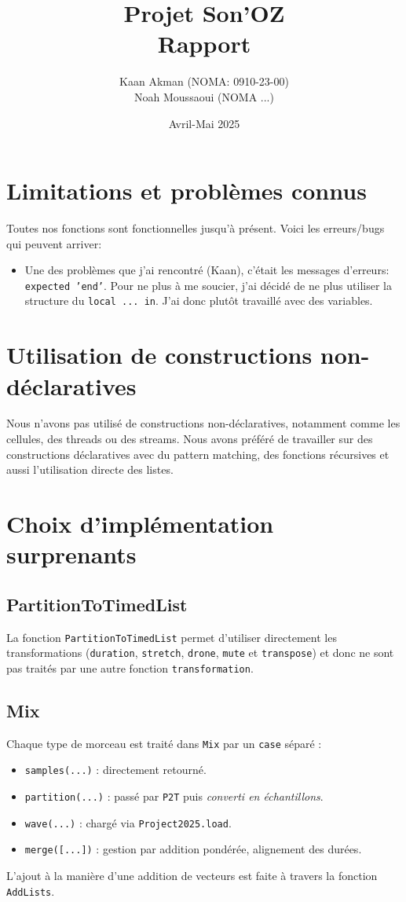 \documentclass[a4paper,11pt]{article}
\title{Projet Son'OZ\\Rapport}
\author{Kaan Akman (NOMA: 0910-23-00) \\ Noah Moussaoui (NOMA ...)}
\date{Avril-Mai 2025}
\begin{document}
\maketitle

\section{Limitations et problèmes connus}

Toutes nos fonctions sont fonctionnelles jusqu'à présent. Voici les erreurs/bugs qui peuvent arriver:
\begin{itemize}
    \item Une des problèmes que j'ai rencontré (Kaan), c'était les messages d'erreurs: \texttt{expected 'end'}. Pour ne plus à me soucier, j'ai décidé de ne plus utiliser la structure du \texttt{local ... in}. J'ai donc plutôt travaillé avec des variables.\end{itemize}


\section{Utilisation de constructions non-déclaratives}

Nous n'avons pas utilisé de constructions non-déclaratives, notamment comme les cellules, des threads ou des streams. Nous avons préféré de travailler sur des constructions déclaratives avec du pattern matching, des fonctions récursives et aussi l'utilisation directe des listes.

\section{Choix d'implémentation surprenants}

\subsection*{PartitionToTimedList}
La fonction \texttt{PartitionToTimedList} permet d'utiliser directement les transformations (\texttt{duration}, \texttt{stretch}, \texttt{drone}, \texttt{mute} et \texttt{transpose}) et donc ne sont pas traités par une autre fonction \texttt{transformation}.

\subsection*{Mix}
Chaque type de morceau est traité dans \texttt{Mix} par un \texttt{case} séparé :
\begin{itemize}
    \item \texttt{samples(...)} : directement retourné.
    \item \texttt{partition(...)} : passé par \texttt{P2T} puis \textit{converti en échantillons}.
    \item \texttt{wave(...)} : chargé via \texttt{Project2025.load}.
    \item \texttt{merge([...])} : gestion par addition pondérée, alignement des durées.
\end{itemize}
L'ajout à la manière d'une addition de vecteurs est faite à travers la fonction \texttt{AddLists}.
\end{document}
